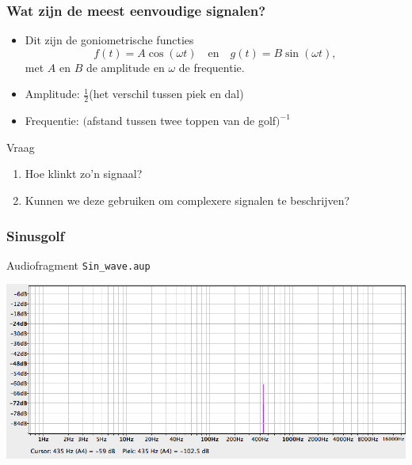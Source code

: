 \documentclass[compress, darktitle, framenumber, totalframenumber]{beamer}
\begin{document}
\begin{frame}
\frametitle{Wat zijn de meest eenvoudige signalen?}
\begin{itemize}
\item Dit zijn de goniometrische functies 
\begin{equation*}
f(t)=A\cos (\omega t) \quad \text{en} \quad g(t)=B\sin (\omega t),
\end{equation*} 
met $A$ en $B$ de amplitude en $\omega$ de frequentie. 
\item Amplitude: $\frac{1}{2}$(het verschil tussen piek en dal)
\item Frequentie: $($afstand tussen twee toppen van de golf$)^{-1}$
\end{itemize}
\begin{block}{Vraag}
  \begin{enumerate}
    \item Hoe klinkt zo'n signaal?
    \item Kunnen we deze gebruiken om complexere signalen te beschrijven?  
  \end{enumerate}
\end{block}
\end{frame}

\begin{frame}
\frametitle{Sinusgolf}
\begin{block}{Audiofragment}
\texttt{Sin\_wave.aup}
\end{block}
\pause
\includegraphics[width=\textwidth]{images/Sin_wave.png}
\end{frame}
\end{document}

